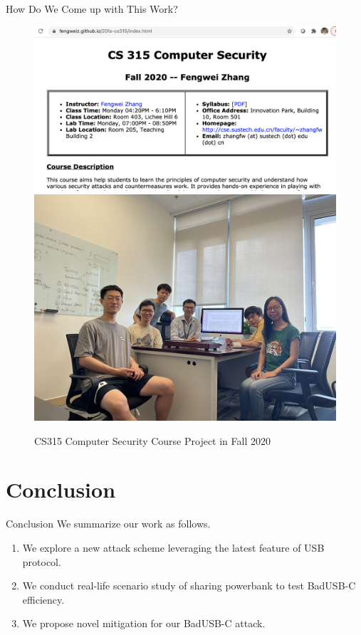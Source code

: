 \documentclass{beamer}
\begin{document}
\begin{frame}{How Do We Come up with This Work?}

	\begin{figure}
			\includegraphics[width=.55\textwidth]{Figs/cs315course}
		\includegraphics[width=.4\textwidth]{Figs/groupphoto.jpg}
		\caption*{CS315 Computer Security Course Project in Fall 2020}
	\end{figure}
\end{frame}


\section{Conclusion}
\begin{frame}{Conclusion}
	We summarize our work as follows.
	\begin{enumerate}
		\item We explore a new attack scheme leveraging the latest feature of USB protocol.
		\item We conduct real-life scenario study of sharing powerbank to test BadUSB-C efficiency.
		\item We propose novel mitigation for our BadUSB-C attack.
	\end{enumerate}
\end{frame}
\end{document}
